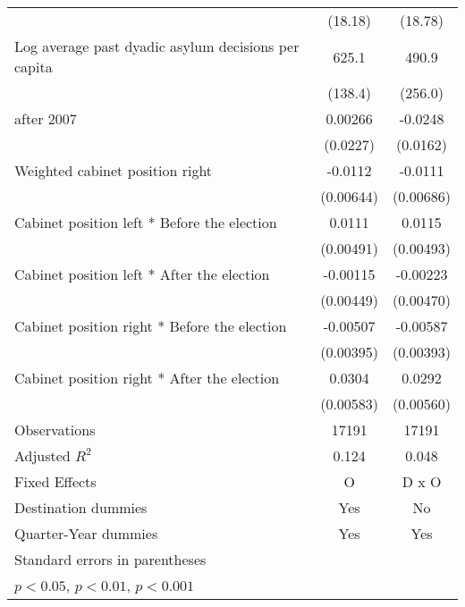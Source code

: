 \begin{table}[htbp]
\begin{tabular}{l*{2}{c}}
                    &     (18.18)         &     (18.78)         \\
[1em]
Log average past dyadic asylum decisions per capita&       625.1\sym{***}&       490.9         \\
                    &     (138.4)         &     (256.0)         \\
[1em]
after 2007          &     0.00266         &     -0.0248         \\
                    &    (0.0227)         &    (0.0162)         \\
[1em]
Weighted cabinet position right&     -0.0112         &     -0.0111         \\
                    &   (0.00644)         &   (0.00686)         \\
[1em]
Cabinet position left * Before the election&      0.0111\sym{*}  &      0.0115\sym{*}  \\
                    &   (0.00491)         &   (0.00493)         \\
[1em]
Cabinet position left * After the election&    -0.00115         &    -0.00223         \\
                    &   (0.00449)         &   (0.00470)         \\
[1em]
Cabinet position right * Before the election&    -0.00507         &    -0.00587         \\
                    &   (0.00395)         &   (0.00393)         \\
[1em]
Cabinet position right * After the election&      0.0304\sym{***}&      0.0292\sym{***}\\
                    &   (0.00583)         &   (0.00560)         \\
\hline
Observations        &       17191         &       17191         \\
Adjusted \(R^{2}\)  &       0.124         &       0.048         \\
Fixed Effects       &           O         &       D x O         \\
Destination dummies &         Yes         &          No         \\
Quarter-Year dummies&         Yes         &         Yes         \\
\hline\hline
\multicolumn{3}{l}{\footnotesize Standard errors in parentheses}\\
\multicolumn{3}{l}{\footnotesize \sym{*} \(p<0.05\), \sym{**} \(p<0.01\), \sym{***} \(p<0.001\)}\\
\end{tabular}
\end{table}
